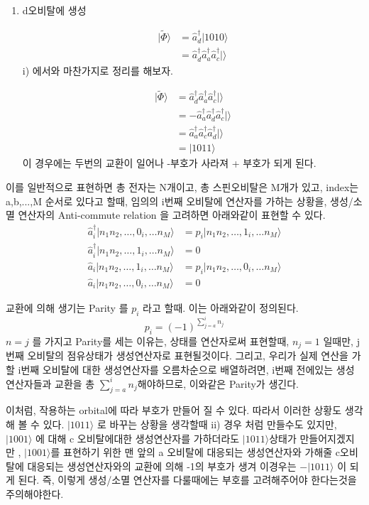 \documentclass[11pt]{article}
\begin{document}
\begin{enumerate}[label=\(\mathrm{ii}\))]
\item {d오비탈에 생성}

\begin{align*}
| \tilde{\Phi }\rangle & = \hat{a}_d^{\dagger}\vert 1010 \rangle \\
& = \hat{a}_d^{\dagger}\hat{a}_a^{\dagger}\hat{a}_c^{\dagger} \vert \rangle 
\end{align*}
i) 에서와 마찬가지로 정리를 해보자. 

\begin{align*}
| \tilde{\Phi }\rangle & = \hat{a}_d^{\dagger}\hat{a}_a^{\dagger}\hat{a}_c^{\dagger} \vert\rangle \\
& = -\hat{a}_a^{\dagger}\hat{a}_d^{\dagger}\hat{a}_c^{\dagger} \vert \rangle \\
& = \hat{a}_a^{\dagger}\hat{a}_c^{\dagger}\hat{a}_d^{\dagger} \vert \rangle  \\
& = \vert 1011 \rangle
\end{align*}
이 경우에는 두번의 교환이 일어나 -부호가 사라져 + 부호가 되게 된다. 
\end{enumerate}
이를 일반적으로 표현하면 총 전자는 N개이고, 총 스핀오비탈은 M개가 있고, index는 a,b,...,M 순서로 있다고 할때, 임의의 i번째 오비탈에 연산자를 가하는 상황을, 
생성/소멸 연산자의 Anti-commute relation 을 고려하면 아래와같이 표현할 수 있다.
\begin{align*}
\hat{a}_i^{\dagger}\vert n_1 n_2 ,\dots, 0_i ,\dots n_M \rangle &= p_i \vert n_1 n_2 ,\dots, 1_i ,\dots n_M \rangle \\
\hat{a}_i^{\dagger}\vert n_1 n_2 ,\dots, 1_i ,\dots n_M \rangle &= 0 \\
\hat{a}_i\vert n_1 n_2 ,\dots, 1_i ,\dots n_M \rangle &= p_i \vert n_1 n_2 ,\dots, 0_i ,\dots n_M \rangle \\
\hat{a}_i\vert n_1 n_2 ,\dots, 0_i ,\dots n_M \rangle &= 0
\end{align*}

교환에 의해 생기는 Parity 를 \(p_i\) 라고 할때. 이는 아래와같이 정의된다. 
\[p_i = (-1)^{\sum_{j=a}^{i}n_j}\]
\(n=j\) 를 가지고 Parity를 세는 이유는, 상태를 연산자로써 표현할때, \(n_j=1\) 일때만, j번째 오비탈의 점유상태가 생성연산자로 표현될것이다. 
그리고, 우리가 실제 연산을 가할 i번째 오비탈에 대한 생성연산자를 오름차순으로 배열하려면, i번째 전에있는 생성연산자들과 교환을 총 \(\sum_{j=a}^{i}n_j\)해야하므로, 이와같은 Parity가 생긴다. 

이처럼, 작용하는 orbital에 따라 부호가 만들어 질 수 있다. 따라서 이러한 상황도 생각해 볼 수 있다.  \(\vert 1011 \rangle\) 로 바꾸는 상황을 생각할때 ii) 경우 처럼 만들수도 있지만, 
\(\vert 1001 \rangle\) 에 대해 c 오비탈에대한 생성연산자를 가하더라도 \(\vert 1011 \rangle\)상태가 만들어지겠지만 , \(\vert 1001 \rangle\)를 표현하기 위한 맨 앞의 a 오비탈에 대응되는 생성연산자와 
가해줄 c오비탈에 대응되는 생성연산자와의 교환에 의해 -1의 부호가 생겨 이경우는 \(-\vert 1011 \rangle\) 이 되게 된다. 
즉, 이렇게 생성/소멸 연산자를 다룰때에는 부호를 고려해주어야 한다는것을 주의해야한다. 
\end{document}
